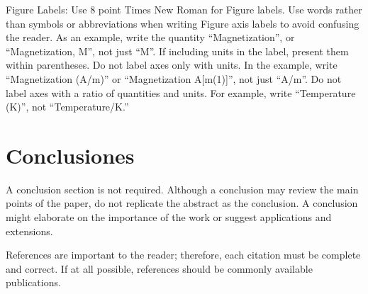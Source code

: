 \documentclass[letterpaper, 12 pt, conference]{ieeeconf}  %
\begin{document}
   

Figure Labels: Use 8 point Times New Roman for Figure labels. Use words rather than symbols or abbreviations when writing Figure axis labels to avoid confusing the reader. As an example, write the quantity ``Magnetization'', or ``Magnetization, M'', not just ``M''. If including units in the label, present them within parentheses. Do not label axes only with units. In the example, write ``Magnetization (A/m)'' or ``Magnetization {A[m(1)]}'', not just ``A/m''. Do not label axes with a ratio of quantities and units. For example, write ``Temperature (K)'', not ``Temperature/K.''

\section{Conclusiones}

A conclusion section is not required. Although a conclusion may review the main points of the paper, do not replicate the abstract as the conclusion. A conclusion might elaborate on the importance of the work or suggest applications and extensions. 

\addtolength{\textheight}{-12cm}   %







%
%
%
%



References are important to the reader; therefore, each citation must be complete and correct. If at all possible, references should be commonly available publications.

{}

\end{document}

